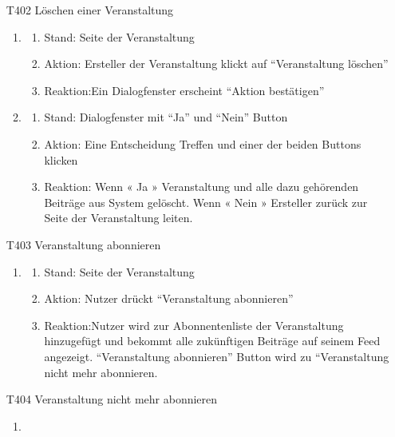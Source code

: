 \documentclass[parskip=full]{scrartcl}
\begin{document}
\begin{itemize}
		\item[T402] Löschen einer Veranstaltung
		\begin{enumerate}
			\item
			
			\begin{enumerate}[nosep]
				\item Stand: Seite der Veranstaltung
				\item Aktion: Ersteller der Veranstaltung klickt auf “Veranstaltung löschen”
				\item Reaktion:Ein Dialogfenster erscheint “Aktion bestätigen”
			\end{enumerate}
			\item
			\begin{enumerate}[nosep]	
				\item Stand: Dialogfenster mit “Ja” und “Nein” \gls{Button}
				\item Aktion: Eine Entscheidung Treffen und einer der beiden \gls{Button}s klicken
				\item Reaktion: Wenn « Ja » Veranstaltung und alle dazu gehörenden Beiträge aus System gelöscht.
				Wenn  «  Nein »  Ersteller zurück zur Seite der Veranstaltung leiten.
			\end{enumerate}	
		\end{enumerate}
		
		\item[T403] Veranstaltung abonnieren
		\begin{enumerate}
			\item
			
			\begin{enumerate}[nosep]
				\item Stand: Seite der Veranstaltung
				\item Aktion: Nutzer drückt “Veranstaltung abonnieren”
				\item Reaktion:Nutzer wird zur \gls{Abonnenten}liste der Veranstaltung hinzugefügt und bekommt alle zukünftigen Beiträge auf seinem \gls{Feed} angezeigt. “Veranstaltung abonnieren” \gls{Button} wird zu “Veranstaltung nicht mehr abonnieren.
				
			\end{enumerate}
		\end{enumerate}
		
		\newpage
		\item[T404] Veranstaltung nicht mehr abonnieren
		\begin{enumerate}
			\item
			

\end{enumerate}
\end{itemize}
\end{document}

